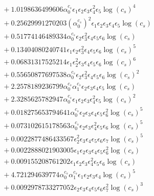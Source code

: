 \documentclass[10pt]{article}
\begin{document}
\begin{align*}
&{}  + 1.0198636499606 \alpha_{0}^{c_s} \epsilon_{1} \epsilon_{2} \epsilon_{3} \epsilon_{4}^{2} \epsilon_{5} \log{\left(c_{s} \right)}^{4} \\
&{}  + 0.25629991270203 \left(\alpha_{0}^{c_s}\right)^{2} \epsilon_{1} \epsilon_{2} \epsilon_{3} \epsilon_{4} \epsilon_{5} \log{\left(c_{s} \right)} \\
&{}  + 0.51774146489334 \alpha_{0}^{c_s} \epsilon_{2} \epsilon_{3}^{2} \epsilon_{4} \epsilon_{5} \epsilon_{6} \log{\left(c_{s} \right)} \\
&{}  + 0.13404080240741 \epsilon_{1} \epsilon_{2} \epsilon_{3}^{2} \epsilon_{4} \epsilon_{5} \epsilon_{6} \log{\left(c_{s} \right)}^{5} \\
&{}  + 0.06831317525214 \epsilon_{1} \epsilon_{2}^{2} \epsilon_{3} \epsilon_{4} \epsilon_{5} \epsilon_{6} \log{\left(c_{s} \right)}^{6} \\
&{}  + 0.55650877697538 \alpha_{0}^{c_s} \epsilon_{2} \epsilon_{3}^{2} \epsilon_{4} \epsilon_{5} \epsilon_{6} \log{\left(c_{s} \right)}^{2} \\
&{}  + 2.2578189236799 \alpha_{0}^{c_s} \alpha_{1}^{c_s} \epsilon_{2} \epsilon_{3} \epsilon_{4} \epsilon_{5} \log{\left(c_{s} \right)} \\
&{}  + 2.3285625782947 \alpha_{0}^{c_s} \epsilon_{1} \epsilon_{2} \epsilon_{3} \epsilon_{4}^{2} \epsilon_{5} \log{\left(c_{s} \right)}^{2} \\
&{}  + 0.018275653794641 \alpha_{0}^{c_s} \epsilon_{2} \epsilon_{3} \epsilon_{4} \epsilon_{5} \epsilon_{6}^{2} \log{\left(c_{s} \right)}^{5} \\
&{}  + 0.073102615178563 \alpha_{0}^{c_s} \epsilon_{2} \epsilon_{3} \epsilon_{4}^{2} \epsilon_{5} \epsilon_{6} \log{\left(c_{s} \right)}^{5} \\
&{}  + 0.0022877486433567 \epsilon_{2}^{2} \epsilon_{3} \epsilon_{4} \epsilon_{5} \epsilon_{6} \epsilon_{7} \log{\left(c_{s} \right)}^{5} \\
&{}  + 0.0022888021903005 \epsilon_{1} \epsilon_{2} \epsilon_{3} \epsilon_{4} \epsilon_{5} \epsilon_{6}^{2} \log{\left(c_{s} \right)} \\
&{}  + 0.009155208761202 \epsilon_{1} \epsilon_{2} \epsilon_{3} \epsilon_{4}^{2} \epsilon_{5} \epsilon_{6} \log{\left(c_{s} \right)} \\
&{}  + 4.721294639774 \alpha_{0}^{c_s} \alpha_{1}^{c_s} \epsilon_{1} \epsilon_{2} \epsilon_{3} \epsilon_{4} \log{\left(c_{s} \right)}^{5} \\
&{}  + 0.0092978733277052 \epsilon_{2} \epsilon_{3} \epsilon_{4} \epsilon_{5} \epsilon_{6} \epsilon_{7}^{2} \log{\left(c_{s} \right)}^{3} \\

\end{align*}
\end{document}
